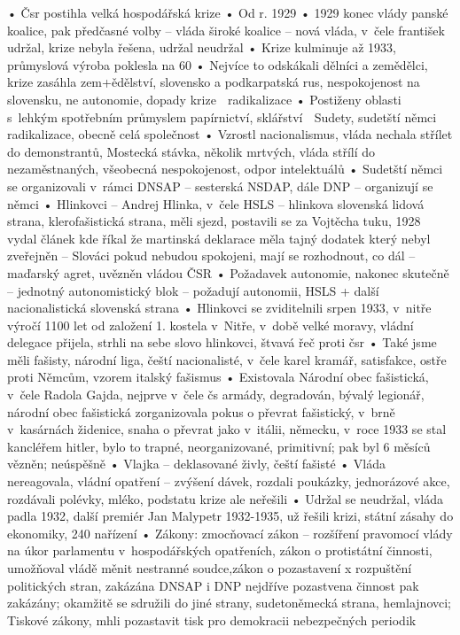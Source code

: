\documentclass{article}
\begin{document}
    • Čsr postihla velká hospodářská krize
    • Od r. 1929
    • 1929 konec vlády panské koalice, pak předčasné volby – vláda široké koalice – nová vláda, v čele františek udržal, krize nebyla řešena, udržal neudržal
    • Krize kulminuje až 1933, průmyslová výroba poklesla na 60 %
    • Nejvíce to odskákali dělníci a zemědělci, krize zasáhla zem+ědělství, slovensko a podkarpatská rus, nespokojenost na slovensku, ne autonomie, dopady krize  radikalizace
    • Postiženy oblasti s lehkým spotřebním průmyslem papírnictví, sklářství  Sudety, sudetští němci radikalizace, obecně celá společnost
    • Vzrostl nacionalismus, vláda nechala střílet do demonstrantů, Mostecká stávka, několik mrtvých, vláda střílí do nezaměstnaných, všeobecná nespokojenost, odpor intelektuálů
    • Sudetští němci se organizovali v rámci DNSAP – sesterská NSDAP, dále DNP – organizují se němci
    • Hlinkovci – Andrej Hlinka, v čele HSLS – hlinkova slovenská lidová strana, klerofašistická strana, měli sjezd, postavili se za Vojtěcha tuku, 1928 vydal článek kde říkal že martinská deklarace měla tajný dodatek který nebyl zveřejněn – Slováci pokud nebudou spokojeni, mají se rozhodnout, co dál – maďarský agret, uvězněn vládou ČSR
    • Požadavek autonomie, nakonec skutečně – jednotný autonomistický blok – požadují autonomii, HSLS + další nacionalistická slovenská strana
    • Hlinkovci se zviditelnili srpen 1933, v nitře výročí 1100 let od založení 1. kostela v Nitře, v době velké moravy, vládní delegace přijela, strhli na sebe slovo hlinkovci, štvavá řeč proti čsr
    • Také jsme měli fašisty, národní liga, čeští nacionalisté, v čele karel kramář, satisfakce, ostře proti Němcům, vzorem italský fašismus
    • Existovala Národní obec fašistická, v čele Radola Gajda, nejprve v čele čs armády, degradován, bývalý legionář, národní obec fašistická zorganizovala pokus o převrat fašistický, v brně v kasárnách židenice, snaha o převrat jako v itálii, německu, v roce 1933 se stal kancléřem hitler, bylo to trapné, neorganizované, primitivní; pak byl 6 měsíců vězněn; neúspěšně
    • Vlajka – deklasované živly, čeští fašisté
    • Vláda nereagovala, vládní opatření – zvýšení dávek, rozdali poukázky, jednorázové akce, rozdávali polévky, mléko, podstatu krize ale neřešili
    • Udržal se neudržal, vláda padla 1932, další premiér Jan Malypetr 1932-1935, už řešili krizi, státní zásahy do ekonomiky, 240 nařízení
    • Zákony: zmocňovací zákon – rozšíření pravomocí vlády na úkor parlamentu v hospodářských opatřeních, zákon o protistátní činnosti, umožňoval vládě měnit nestranné soudce,zákon o pozastavení x rozpuštění politických stran, zakázána DNSAP i DNP nejdříve pozastvena činnost pak zakázány; okamžitě se sdružili do jiné strany, sudetoněmecká strana, hemlajnovci; Tiskové zákony, mhli pozastavit tisk pro demokracii nebezpečných periodik
\end{document}
